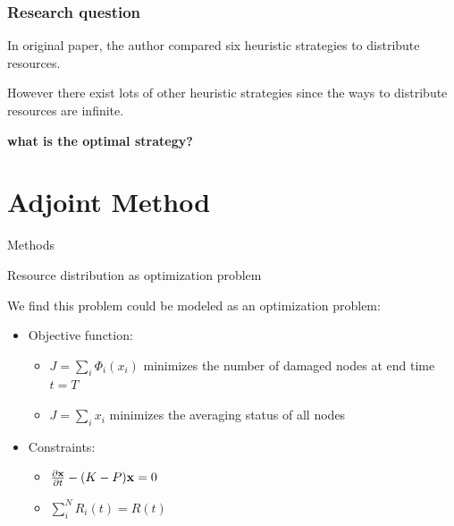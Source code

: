 \documentclass{beamer}
\newcommand{\pa}{\partial}
\newcommand{\xx}{{\bf x}}
\begin{document}
\begin{frame}
	\frametitle{Research question}
	In original paper\footnotemark[1]
	, the author compared six heuristic strategies to distribute resources.

	However there exist lots of other heuristic strategies since the ways to distribute resources are infinite.
	\pause

	\vspace{4mm}
	\Large\textbf{what is the optimal strategy?}
\end{frame}

\section{Adjoint Method}
\begin{frame}
\begin{center}
	\Huge {Methods}
\end{center}
\end{frame}

\begin{frame}{Resource distribution as optimization problem}
	\begin{block}{}
		We find this problem could be modeled as an optimization problem: 
	\end{block}
	\begin{itemize}
		\item Objective function:
		\begin{itemize}
			\item $J = \sum_i \Phi_i(x_i) $ minimizes the number of damaged nodes at end time $t = T$
			\item $J = \sum_i x_i $ minimizes the averaging status of all nodes
		\end{itemize}
		\item Constraints: 
			\begin{itemize}
				\item  $\frac{\pa {\xx}}{\pa t} - (K-P)\xx = 0 $ 
				\item  $\sum_i^N R_i(t) = R(t)$
			\end{itemize}
	\end{itemize}
\end{frame}
\end{document}
